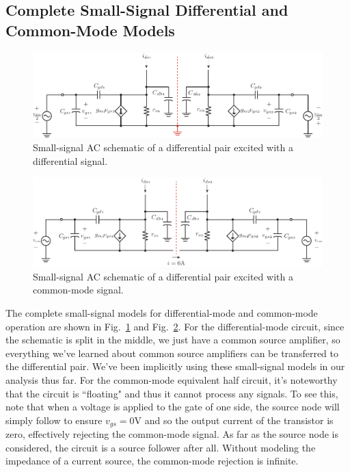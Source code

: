 \subsection{Complete Small-Signal Differential and Common-Mode Models}
\begin{figure}[tb]
\centering
\includegraphics[width=\columnwidth]{DM_symmetry_small_signal.pdf}
\caption{Small-signal AC schematic of a differential pair excited with a differential signal.} \label{fig:DM_symmetry_small_signal.pdf}
\end{figure}
\begin{figure}[tb]
\centering
\includegraphics[width=\columnwidth]{CM_symmetry_small_signal.pdf}
\caption{Small-signal AC schematic of a differential pair excited with a common-mode signal.} \label{fig:CM_symmetry_small_signal.pdf}
\end{figure}
The complete small-signal models for differential-mode and common-mode operation are shown in Fig.~\ref{fig:DM_symmetry_small_signal.pdf} and Fig.~\ref{fig:CM_symmetry_small_signal.pdf}.  For the differential-mode circuit, since the schematic is split in the middle, we just have a common source amplifier, so everything we've learned about common source amplifiers can be transferred to the differential pair.  We've been implicitly using these small-signal models in our analysis thus far.  For the common-mode equivalent half circuit, it's noteworthy that the circuit is ``floating" and thus it cannot process any signals.  To see this, note that when a voltage is applied to the gate of one side, the source node will simply follow to ensure $v_{gs} = 0$V and so the output current of the transistor is zero, effectively rejecting the common-mode signal.  As far as the source node is considered, the circuit is a source follower after all.  Without modeling the impedance of a current source, the common-mode rejection is infinite.
